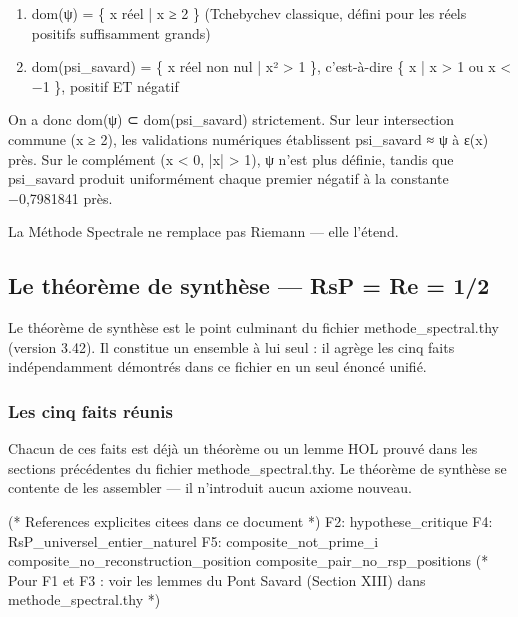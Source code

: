 \documentclass[11pt,a4paper]{article}
\begin{document}
\begin{enumerate}[leftmargin=*]
\item dom(ψ) = \{ x réel | x ≥ 2 \} (Tchebychev classique, défini pour les réels positifs suffisamment grands)
\item dom(psi\_savard) = \{ x réel non nul | x² > 1 \}, c'est-à-dire \{ x | x > 1 ou x < −1 \}, positif ET négatif
\end{enumerate}
On a donc dom(ψ) ⊂ dom(psi\_savard) strictement. Sur leur intersection commune (x ≥ 2), les validations numériques établissent psi\_savard ≈ ψ à ε(x) près. Sur le complément (x < 0, |x| > 1), ψ n'est plus définie, tandis que psi\_savard produit uniformément chaque premier négatif à la constante −0,7981841 près.

La Méthode Spectrale ne remplace pas Riemann — elle l'étend.

\subsection{Le théorème de synthèse — RsP = Re = 1/2}

Le théorème de synthèse est le point culminant du fichier methode\_spectral.thy (version 3.42). Il constitue un ensemble à lui seul : il agrège les cinq faits indépendamment démontrés dans ce fichier en un seul énoncé unifié.

\subsubsection{Les cinq faits réunis}
Chacun de ces faits est déjà un théorème ou un lemme HOL prouvé dans les sections précédentes du fichier methode\_spectral.thy. Le théorème de synthèse se contente de les assembler — il n'introduit aucun axiome nouveau.

\begin{holcode}[title={Index HOL — Faits mobilisés par la synthèse}]
(* References explicites citees dans ce document *)
F2: hypothese_critique
F4: RsP_universel_entier_naturel
F5: composite_not_prime_i composite_no_reconstruction_position composite_pair_no_rsp_positions
(* Pour F1 et F3 : voir les lemmes du Pont Savard (Section XIII) dans methode_spectral.thy *)
\end{holcode}
\end{document}
